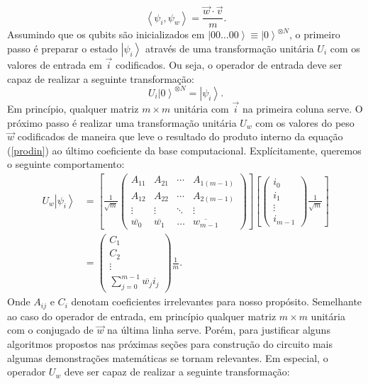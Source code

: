 \begin{equation}
\left\langle \psi_{i},\psi_{w}\right\rangle =\frac{\overrightarrow{w}\cdot\overrightarrow{v}}{m} 
\label{prodin}
. \end{equation}
Assumindo que os qubits são inicializados em $\left|00\dots00\right\rangle \equiv\left|0\right\rangle ^{\otimes N}$, o primeiro passo é preparar o estado $\left|\psi_{i}\right\rangle $ através de uma transformação unitária $U_{i}$ com os valores de entrada em $\overrightarrow{i}$ codificados. Ou seja, o operador de entrada deve ser capaz de realizar a seguinte transformação:
\begin{equation}U_{i}\left|0\right\rangle ^{\otimes N}=\left|\psi_{i}\right\rangle . \end{equation}
Em princípio, qualquer matriz $m \times m$ unitária com $\overrightarrow{i}$ na primeira coluna serve. O  próximo passo é realizar uma  transformação unitária $U_{w}$ com os valores do peso  $\overrightarrow{w}$ codificados  de maneira que leve o resultado do produto interno da equação (\ref{prodin}) ao último coeficiente da base computacional. Explícitamente, queremos o seguinte comportamento:
\begin{equation}
\begin{split}
U_{w}\left|\psi_{i}\right\rangle & =\left[\frac{1}{\sqrt{m}}\left(\begin{array}{cccc}
A_{11} & A_{21} & \cdots & A_{1\left(m-1\right)}\\
A_{12} & A_{22} & \cdots & A_{2\left(m-1\right)}\\
\vdots & \vdots & \ddots & \vdots\\
\overline{w_{0}} & \overline{w_{1}} & \ldots & \overline{w_{m-1}}
\end{array}\right)\right]\left[\left(\begin{array}{c}
i_{0}\\
i_{1}\\
\vdots\\
i_{m-1}
\end{array}\right)\frac{1}{\sqrt{m}}\right] \\
& =\left(\begin{array}{c}
C_{1}\\
C_{2}\\
\vdots\\
\sum_{j=0}^{m-1}\overline{w_{j}}i_{j}
\end{array}\right)\frac{1}{m}.
\end{split}
\end{equation}
Onde $A_{ij}$  e $C_{i}$ denotam coeficientes irrelevantes para nosso propósito. Semelhante ao caso do operador de entrada,  em princípio qualquer matriz $m \times m$ unitária com o conjugado de $\overrightarrow{w}$ na última linha serve. Porém, para justificar alguns algoritmos propostos nas próximas seções para construção do circuito mais algumas demonstrações matemáticas  se tornam relevantes. Em especial, o operador $U_{w}$  deve ser capaz de realizar a seguinte transformação:
